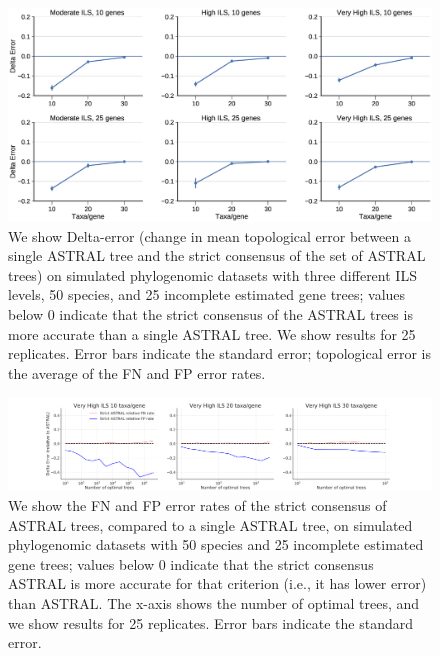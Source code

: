 \begin{figure}[ht]
  \centering
 \includegraphics[width=.9\textwidth]{siesta-figs/astral_missing_delta_error}
  \caption[Change in topological error between ASTRAL and the SIESTA strict consensus of ASTRAL trees on simulated data, varying ILS level and number of genes]{
We show Delta-error (change in mean topological error between a single ASTRAL tree and the strict consensus of  the set of ASTRAL trees) on simulated phylogenomic datasets with three different ILS levels, 50 species,  and 25 incomplete estimated gene trees; values below 0 indicate that the strict consensus of the ASTRAL trees is more accurate  than a single ASTRAL tree.
 We show results for 25 replicates.
Error bars indicate the standard error; 
  topological error is the average of the FN and FP error rates.
  }
    \label{siesta::fig:astral-error}
\end{figure}


\begin{figure}[ht]
  \centering
 \includegraphics[width=.9\textwidth]{siesta-figs/astral-missing-ntrees}
    \caption[Change in topological error between ASTRAL and the SIESTA strict consensus of ASTRAL trees on simulated data, varying amount of missing data]{
We show the FN and FP error rates of the strict consensus of  ASTRAL trees, compared to a single ASTRAL tree,  on simulated phylogenomic datasets with 50 species and 25 incomplete estimated gene trees; values below 0 indicate that the strict consensus ASTRAL is more accurate for that criterion  (i.e., it has lower error) than ASTRAL. The x-axis shows the number of optimal trees, and 
 we show results for 25 replicates.
Error bars indicate the standard error.
  }
  \label{siesta::fig:astral-error-vs-number}
\end{figure}


